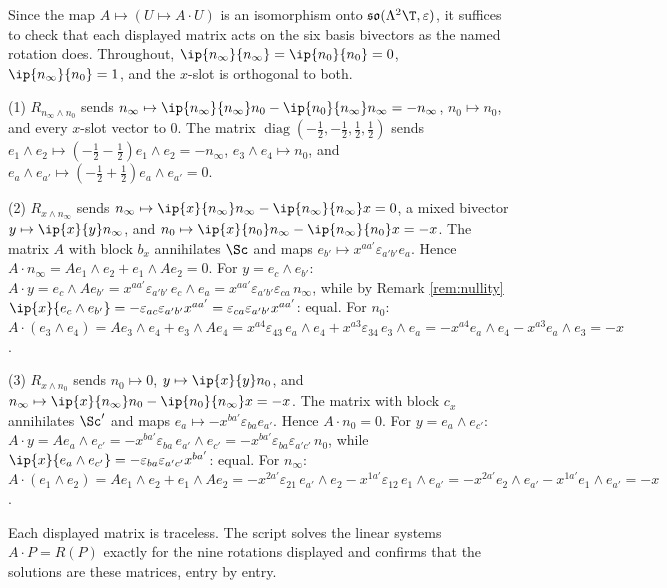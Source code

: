 Since the map $A \mapsto (U \mapsto A\cdot U)$ is an isomorphism onto $\mathfrak{so}(\Lambda^{2}\T,\varepsilon)$, it suffices to check that each displayed matrix acts on the six basis bivectors as the named rotation does. Throughout, $\ip{n_{\infty}}{n_{\infty}} = \ip{n_{0}}{n_{0}} = 0$, $\ip{n_{\infty}}{n_{0}} = 1$, and the $x$-slot is orthogonal to both.

(1) $R_{n_{\infty}\wedge n_{0}}$ sends $n_{\infty} \mapsto \ip{n_{\infty}}{n_{\infty}}n_{0} - \ip{n_{0}}{n_{\infty}}n_{\infty} = -n_{\infty}$, $n_{0} \mapsto n_{0}$, and every $x$-slot vector to $0$. The matrix $\operatorname{diag}(-\tfrac12,-\tfrac12,\tfrac12,\tfrac12)$ sends $e_{1}\wedge e_{2} \mapsto (-\tfrac12 - \tfrac12)e_{1}\wedge e_{2} = -n_{\infty}$, $e_{3}\wedge e_{4} \mapsto n_{0}$, and $e_{a}\wedge e_{a'} \mapsto (-\tfrac12 + \tfrac12)e_{a}\wedge e_{a'} = 0$.

(2) $R_{x\wedge n_{\infty}}$ sends $n_{\infty} \mapsto \ip{x}{n_{\infty}}n_{\infty} - \ip{n_{\infty}}{n_{\infty}}x = 0$, a mixed bivector $y \mapsto \ip{x}{y}n_{\infty}$, and $n_{0} \mapsto \ip{x}{n_{0}}n_{\infty} - \ip{n_{\infty}}{n_{0}}x = -x$. The matrix $A$ with block $b_{x}$ annihilates $\Sc$ and maps $e_{b'} \mapsto x^{aa'}\varepsilon_{a'b'}e_{a}$. Hence $A\cdot n_{\infty} = Ae_{1}\wedge e_{2} + e_{1}\wedge Ae_{2} = 0$. For $y = e_{c}\wedge e_{b'}$: $A\cdot y = e_{c}\wedge Ae_{b'} = x^{aa'}\varepsilon_{a'b'}\,e_{c}\wedge e_{a} = x^{aa'}\varepsilon_{a'b'}\varepsilon_{ca}\,n_{\infty}$, while by Remark \ref{rem:nullity} $\ip{x}{e_{c}\wedge e_{b'}} = -\varepsilon_{ac}\varepsilon_{a'b'}x^{aa'} = \varepsilon_{ca}\varepsilon_{a'b'}x^{aa'}$: equal. For $n_{0}$: $A\cdot(e_{3}\wedge e_{4}) = Ae_{3}\wedge e_{4} + e_{3}\wedge Ae_{4} = x^{a4}\varepsilon_{43}\,e_{a}\wedge e_{4} + x^{a3}\varepsilon_{34}\,e_{3}\wedge e_{a} = -x^{a4}e_{a}\wedge e_{4} - x^{a3}e_{a}\wedge e_{3} = -x$.

(3) $R_{x\wedge n_{0}}$ sends $n_{0} \mapsto 0$, $y \mapsto \ip{x}{y}n_{0}$, and $n_{\infty} \mapsto \ip{x}{n_{\infty}}n_{0} - \ip{n_{0}}{n_{\infty}}x = -x$. The matrix with block $c_{x}$ annihilates $\Sc'$ and maps $e_{a} \mapsto -x^{ba'}\varepsilon_{ba}e_{a'}$. Hence $A\cdot n_{0} = 0$. For $y = e_{a}\wedge e_{c'}$: $A\cdot y = Ae_{a}\wedge e_{c'} = -x^{ba'}\varepsilon_{ba}\,e_{a'}\wedge e_{c'} = -x^{ba'}\varepsilon_{ba}\varepsilon_{a'c'}\,n_{0}$, while $\ip{x}{e_{a}\wedge e_{c'}} = -\varepsilon_{ba}\varepsilon_{a'c'}x^{ba'}$: equal. For $n_{\infty}$: $A\cdot(e_{1}\wedge e_{2}) = Ae_{1}\wedge e_{2} + e_{1}\wedge Ae_{2} = -x^{2a'}\varepsilon_{21}\,e_{a'}\wedge e_{2} - x^{1a'}\varepsilon_{12}\,e_{1}\wedge e_{a'} = -x^{2a'}e_{2}\wedge e_{a'} - x^{1a'}e_{1}\wedge e_{a'} = -x$.

Each displayed matrix is traceless. The script solves the linear systems $A\cdot P = R(P)$ exactly for the nine rotations displayed and confirms that the solutions are these matrices, entry by entry.
